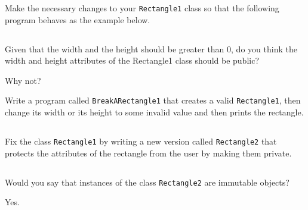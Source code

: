 \documentclass[a4paper, 11pt]{article}
\begin{document}
Make the necessary changes to your \verb+Rectangle1+ class so that the following
program behaves as the example below.









\subsection{}

Given that the width and the height should be greater than 0, do you think the
width and height attributes of the Rectangle1 class should be public?

Why not?

Write a program called \verb+BreakARectangle1+ that creates a valid
\verb+Rectangle1+, then change its width or its height to some invalid value
and then prints the rectangle.






\subsection{}

Fix the class \verb+Rectangle1+ by writing a new version called
\verb+Rectangle2+ that protects the attributes of the rectangle from the user
by making them private.





\subsection{}

Would you say that instances of the class \verb+Rectangle2+ are immutable
objects?

\begin{solution}
Yes.
\end{solution}
\end{document}
